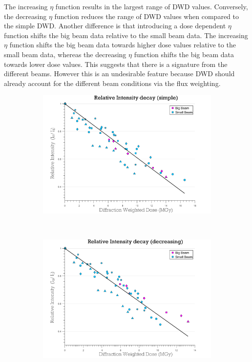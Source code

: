 The increasing $\eta$ function results in the largest range of DWD values.
Conversely, the decreasing $\eta$ function reduces the range of DWD values when compared to the simple DWD.
Another difference is that introducing a dose dependent $\eta$ function shifts the big beam data relative to the small beam data.
The increasing $\eta$ function shifts the big beam data towards higher dose values relative to the small beam data, whereas the decreasing $\eta$ function shifts the big beam data towards lower dose values.
This suggests that there is a signature from the different beams.
However this is an undesirable feature because DWD should already account for the different beam conditions via the flux weighting.
\begin{figure}
	\centering
    \begin{subfigure}[b]{1\textwidth}
        \centering
        \includegraphics[width=\textwidth]{figures/dwd/reproduce_relint_DWDsimple.pdf}
        \caption{}
        \label{fig:Relative intensity - Simple DWD}
    \end{subfigure}
    \\
	\begin{subfigure}[b]{1\textwidth}
        \centering
        \includegraphics[width=\textwidth]{figures/dwd/reproduce_relint_DWDwrong.pdf}
        \caption{}
        \label{fig:Relative intensity - Increasing Eta}
    \end{subfigure}
\end{figure}
